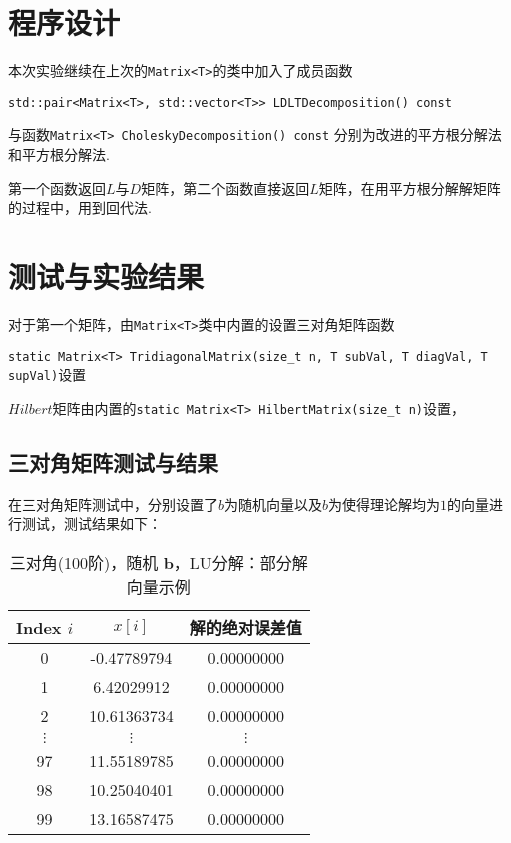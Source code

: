 \documentclass[UTF8]{ctexart}
\begin{document}
\pagestyle{fancy}
\fancyhead{}

\section{程序设计}

本次实验继续在上次的\texttt{Matrix<T>}的类中加入了成员函数

\texttt{std::pair<Matrix<T>, std::vector<T>> LDLTDecomposition() const}

与函数\texttt{Matrix<T> CholeskyDecomposition() const} 分别为改进的平方根分解法和平方根分解法.

第一个函数返回$L$与$D$矩阵，第二个函数直接返回$L$矩阵，在用平方根分解解矩阵的过程中，用到回代法.

\section{测试与实验结果}

对于第一个矩阵，由\texttt{Matrix<T>}类中内置的设置三对角矩阵函数

\texttt{static Matrix<T> TridiagonalMatrix(size\_t n, T subVal, T diagVal, T supVal)}设置

$Hilbert$矩阵由内置的\texttt{static Matrix<T> HilbertMatrix(size\_t n)}设置，

\subsection{三对角矩阵测试与结果}

在三对角矩阵测试中，分别设置了$b$为随机向量以及$b$为使得理论解均为$1$的向量进行测试，测试结果如下：

\begin{table}[ht]
  \centering
  \caption{三对角(100阶)，随机 $\mathbf{b}$，LU分解：部分解向量示例}
  \label{tab:tri100-randb-LU}
  \begin{tabular}{ccc}
  \toprule
  \textbf{Index} $i$ & $x[i]$  &  解的绝对误差值 \\
  \midrule
  0   &  -0.47789794  & 0.00000000\\
  1   &  6.42029912  & 0.00000000\\
  2   &  10.61363734  &0.00000000\\
  $\vdots$ & $\vdots$ & $\vdots$\\
  97  &  11.55189785  &0.00000000\\
  98  &  10.25040401  &0.00000000\\
  99  &  13.16587475  &0.00000000\\
  \bottomrule
  \end{tabular}
  \end{table}
  
\end{document}
